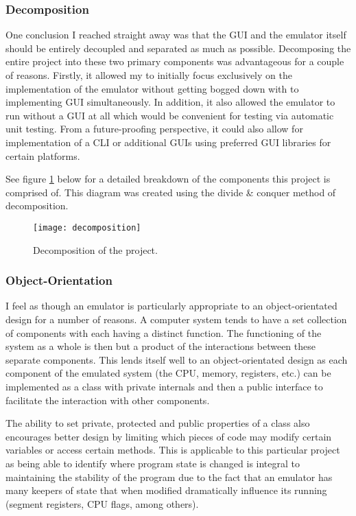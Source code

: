     \subsubsection{Decomposition}
        One conclusion I reached straight away was that the GUI and the emulator itself should be entirely decoupled and separated as much as possible. Decomposing the entire project into these two primary components was advantageous for a couple of reasons. Firstly, it allowed my to initially focus exclusively on the implementation of the emulator without getting bogged down with to implementing GUI simultaneously. In addition, it also allowed the emulator to run without a GUI at all which would be convenient for testing via automatic unit testing. From a future-proofing perspective, it could also allow for implementation of a CLI or additional GUIs using preferred GUI libraries for certain platforms.

        See figure \ref{fig:decomp} below for a detailed breakdown of the components this project is comprised of. This diagram was created using the divide \& conquer method of decomposition.

        \begin{figure}[h]
            \centering
            \texttt{[image: decomposition]}
            \caption{Decomposition of the project.}
            \label{fig:decomp}
        \end{figure}

    \subsubsection{Object-Orientation}
        I feel as though an emulator is particularly appropriate to an object-orientated design for a number of reasons. A computer system tends to have a set collection of components with each having a distinct function. The functioning of the system as a whole is then but a product of the interactions between these separate components. This lends itself well to an object-orientated design as each component of the emulated system (the CPU, memory, registers, etc.) can be implemented as a class with private internals and then a public interface to facilitate the interaction with other components.

        The ability to set private, protected and public properties of a class also encourages better design by limiting which pieces of code may modify certain variables or access certain methods. This is applicable to this particular project as being able to identify where program state is changed is integral to maintaining the stability of the program due to the fact that an emulator has many keepers of state that when modified dramatically influence its running (segment registers, CPU flags, among others).

